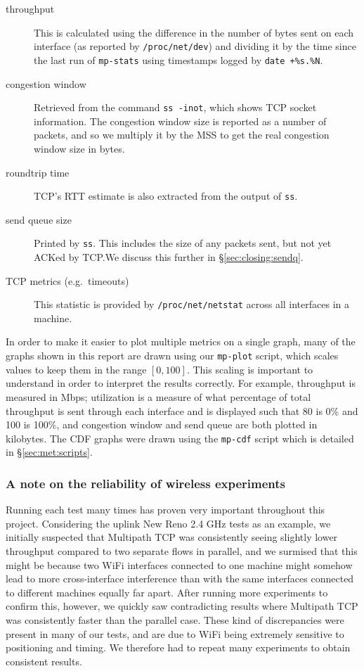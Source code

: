\begin{description}
  \item[throughput]
    This is calculated using the difference in the number of bytes sent on each
    interface (as reported by \texttt{/proc\-/net/\-dev}) and dividing it by the
    time since the last run of \texttt{mp-stats} using timestamps logged by
    \texttt{date +\%s.\%N}.
  \item[congestion window]
    Retrieved from the command \texttt{ss -inot}, which shows TCP socket
    information. The congestion window size is reported as a number of packets,
    and so we multiply it by the MSS to get the real congestion window size in bytes.
  \item[roundtrip time]
    TCP's RTT estimate is also extracted from the output of \texttt{ss}.
  \item[send queue size]
    Printed by \texttt{ss}. This includes the size of any packets sent, but not
    yet ACKed by TCP.\@ We discuss this further in \S\ref{sec:closing:sendq}.
  \item[TCP metrics (e.g.\ timeouts)]
    This statistic is provided by \texttt{/proc\-/net/\-netstat} across all
    interfaces in a machine.
\end{description}

In order to make it easier to plot multiple metrics on a single graph, many of the
graphs shown in this report are drawn using our \texttt{mp-plot} script, which
scales values to keep them in the range $[0,100]$. This scaling is important to
understand in order to interpret the results correctly. For example, throughput
is measured in Mbps; utilization is a measure of what percentage of total
throughput is sent through each interface and is displayed such that 80 is 0\% and
100 is 100\%, and congestion window and send queue are both plotted in
kilobytes. The CDF graphs were drawn using the \texttt{mp-cdf} script which is
detailed in \S\ref{sec:met:scripts}.

\subsubsection{A note on the reliability of wireless experiments}
Running each test many times has proven very important throughout this project.
Considering the uplink New Reno 2.4 GHz tests as an example, we initially 
suspected that Multipath TCP was consistently seeing slightly lower 
throughput compared to two separate flows in parallel, and we surmised that
this might be because two 
WiFi interfaces connected to one machine might somehow lead to more 
cross-interface interference than with the same interfaces connected to 
different machines equally far apart. After running more experiments to confirm this, 
however, we quickly saw contradicting results where Multipath TCP was 
consistently faster than the parallel case. These kind of discrepancies were
present in many of our tests, and are due to WiFi being extremely sensitive to
positioning and timing. We therefore had to repeat many experiments to obtain
consistent results.
